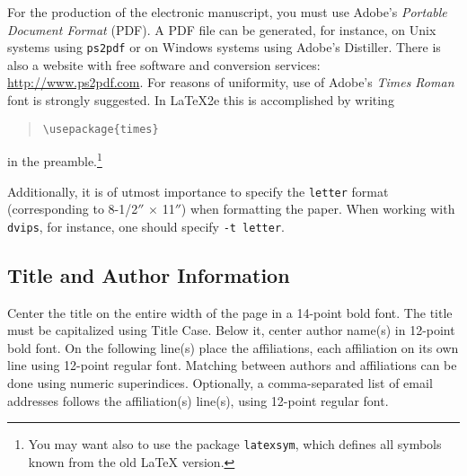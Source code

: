 \documentclass{article}
\begin{document}
For the production of the electronic manuscript, you must use Adobe's
\emph{Portable Document Format} (PDF). A PDF file can be generated, for
instance, on Unix systems using \texttt{ps2pdf} or on Windows systems
using Adobe's Distiller. There is also a website with free software
and conversion services: \url{http://www.ps2pdf.com}. For reasons of
uniformity, use of Adobe's \emph{Times Roman} font is strongly suggested.
In \LaTeX2e{} this is accomplished by writing
\begin{quote}
  \texttt{\textbackslash{}usepackage\{times\}}
\end{quote}
in the preamble.\footnote{You may want also to use the package
 \texttt{latexsym}, which defines all symbols known from the old \LaTeX{}
 version.}

Additionally, it is of utmost importance to specify the \texttt{letter} format
(corresponding to 8-1/2$''$ $\times$ 11$''$) when formatting the paper. When
working with \texttt{dvips}, for instance, one should specify \texttt{-t
 letter}.

\subsection{Title and Author Information}

Center the title on the entire width of the page in a 14-point bold font. The
title must be capitalized using Title Case. Below it, center author name(s) in
12-point bold font. On the following line(s) place the affiliations, each
affiliation on its own line using 12-point regular font. Matching between
authors and affiliations can be done using numeric superindices. Optionally, a
comma-separated list of email addresses follows the affiliation(s) line(s),
using 12-point regular font.


\end{document}
